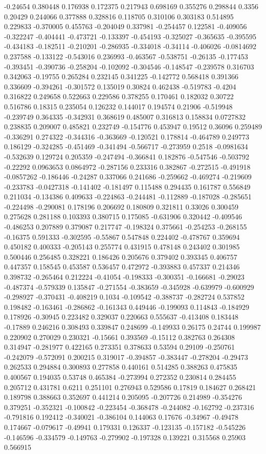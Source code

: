 -0.24654 0.380448 0.176938 0.172375 0.217943 0.698169 0.355276 0.298844 0.3356 0.20429 0.244066 0.377888 0.328816 0.118705 0.310106 0.303183 0.514895 0.229833 -0.370005 0.455763 -0.204049 0.337981 -0.254457 0.122581 -0.409056 -0.322247 -0.404441 -0.473721 -0.133397 -0.454193 -0.325027 -0.365635 -0.395595 -0.434183 -0.182511 -0.210201 -0.286935 -0.334018 -0.34114 -0.406026 -0.0814692 0.237588 -0.133122 -0.543016 0.236993 -0.463567 -0.538751 -0.26135 -0.177453 -0.393451 -0.390736 -0.258204 -0.102092 -0.304546 -0.148547 -0.239578 0.316703 0.342063 -0.19755 0.265284 0.232145 0.341225 -0.142772 0.568418 0.391366 0.336609 -0.394261 -0.301572 0.135019 0.30824 0.462438 -0.519783 -0.4204 0.316822 0.249658 0.522663 0.229586 0.378255 0.170461 0.182032 0.30722 0.516786 0.18315 0.235054 0.126232 0.144017 0.194574 0.21906 -0.519948 -0.239749 0.364335 -0.342931 0.368619 0.485007 0.316813 0.158834 0.0727832 0.238835 0.209007 0.485821 0.232749 -0.154776 0.453947 0.19512 0.36096 0.259489 -0.336291 0.274322 -0.344316 -0.363669 -0.120521 0.178814 -0.464789 0.249773 0.186129 -0.324285 -0.451469 -0.341494 -0.566717 -0.273959 0.2518 -0.0981634 -0.532639 0.129724 0.205359 -0.247494 -0.366841 0.182876 -0.547546 -0.503792 -0.22292 0.0963653 0.0864972 -0.287156 0.233316 0.382867 -0.272515 -0.491918 -0.0857262 -0.186446 -0.24287 0.337066 0.241686 -0.259662 -0.469274 -0.219609 -0.233783 -0.0427318 -0.141402 -0.181497 0.115488 0.294435 0.161787 0.556849 0.211034 -0.134386 0.409633 -0.224863 -0.244481 -0.112889 -0.187028 -0.285651 -0.224498 -0.290081 0.178196 0.206692 0.180809 0.321811 0.33026 0.300459 0.275628 0.281188 0.103393 0.380715 0.175085 -0.631906 0.320442 -0.409546 -0.486253 0.207889 0.379087 0.217747 -0.198324 0.375661 -0.254253 -0.268155 -0.16375 0.591333 -0.302595 -0.55867 0.547848 0.224402 -0.478767 0.359694 0.450182 0.400333 -0.205143 0.255774 0.431915 0.478148 0.243402 0.301985 0.500446 0.256485 0.328221 0.186426 0.205676 0.379402 0.393345 0.406757 0.447357 0.158545 0.453587 0.536457 0.472972 -0.393883 0.457337 0.214346 0.398732 -0.265464 0.212224 -0.41054 -0.198333 -0.300351 -0.166681 -0.29023 -0.487374 -0.579339 0.135847 -0.271554 -0.383659 -0.345928 -0.639979 -0.600929 -0.298927 -0.370431 -0.408219 0.1034 -0.109542 -0.388737 -0.282724 0.537852 0.198482 -0.163461 -0.286862 -0.161343 0.449446 -0.199093 0.114843 -0.184929 0.178926 -0.30945 0.223482 0.329037 0.220663 0.555637 -0.413408 0.183448 -0.17889 0.246216 0.308493 0.339847 0.248699 -0.149933 0.26175 0.24744 0.199987 0.220902 0.270029 0.230321 -0.15661 0.393569 -0.15112 0.382763 0.264308 0.314947 -0.281977 0.422165 0.273351 0.378633 0.53594 0.29109 -0.250761 -0.242079 -0.572091 0.200215 0.319017 -0.394857 -0.383447 -0.278204 -0.29473 0.262533 0.294884 0.300893 0.277858 0.440161 0.514285 0.388263 0.475835 0.400567 0.194035 0.53748 0.465384 -0.273994 0.272352 0.230814 0.284455 0.205712 0.431781 0.6211 0.251101 0.276943 0.529586 0.17819 0.184627 0.268421 0.189798 0.388663 0.352697 0.441214 0.205095 -0.207726 0.214989 -0.354276 0.379251 -0.352321 -0.100842 -0.223454 -0.368478 -0.244082 -0.162792 -0.237316 -0.791816 0.192412 -0.340021 -0.386104 0.144063 0.17676 -0.34967 -0.49478 0.174667 -0.079617 -0.49941 0.179331 0.126337 -0.123135 -0.157182 -0.545226 -0.146596 -0.334579 -0.149763 -0.279902 -0.197328 0.139221 0.315568 0.25903 0.566915 